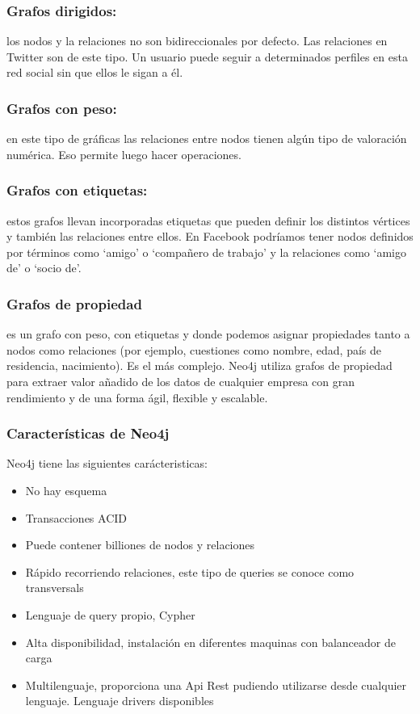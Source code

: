 \subsubsection{ Grafos dirigidos:}
	 los nodos y la relaciones no son bidireccionales por defecto. Las relaciones en Twitter son de este      	tipo. Un usuario puede seguir a determinados perfiles en esta red social sin que ellos le sigan a él.
\newpage
\subsubsection{Grafos con peso:}
	en este tipo de gráficas las relaciones entre nodos tienen algún tipo de valoración numérica. Eso permite luego hacer operaciones.
\subsubsection{Grafos con etiquetas:}
	estos grafos llevan incorporadas etiquetas que pueden definir los distintos vértices y también las relaciones entre ellos. En Facebook podríamos tener nodos definidos por términos como ‘amigo’ o ‘compañero de trabajo’ y la relaciones como ‘amigo de’ o ‘socio de’.
\subsubsection{Grafos de propiedad}
	es un grafo con peso, con etiquetas y donde podemos asignar propiedades tanto a nodos como relaciones (por ejemplo, cuestiones como nombre, edad, país de residencia, nacimiento). Es el más complejo.
	Neo4j utiliza grafos de propiedad para extraer valor añadido de los datos de cualquier empresa con gran rendimiento y de una forma ágil, flexible y escalable.

\subsubsection{Características de Neo4j}
Neo4j tiene las siguientes carácteristicas:
\begin{itemize}
	\item No hay esquema
	\item Transacciones ACID
	\item Puede contener billiones de nodos y relaciones
	\item Rápido recorriendo relaciones, este tipo de queries se conoce como transversals
	\item Lenguaje de query propio, Cypher
	\item Alta disponibilidad, instalación en diferentes maquinas con balanceador de carga
	\item Multilenguaje, proporciona una Api Rest pudiendo utilizarse desde cualquier lenguaje. Lenguaje drivers 			disponibles
\end{itemize}


